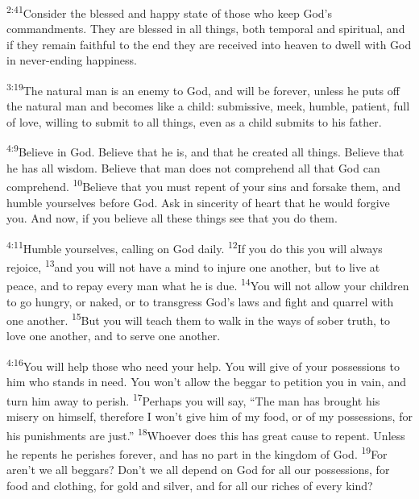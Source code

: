 \documentclass[openany,12pt,english]{book}
\newenvironment{para}{\par\pretolerance=100\tolerance=200\setlength{\emergencystretch}{0.6em}\relax}{\par}
\begin{document}
\begin{para}
    \textsuperscript{2:41}\thinspace{}Con\-sid\-er the bless\-ed and hap\-py state of those who keep God's commandments. They are bless\-ed in all things, both tem\-po\-ral and spir\-it\-u\-al, and if they re\-main faith\-ful to the end they are re\-ceived in\-to heav\-en to dwell with God in never-ending hap\-pi\-ness.
\end{para}

\begin{para}
    \textsuperscript{3:19}\thinspace{}The nat\-u\-ral man is an en\-e\-my to God, and will be for\-ev\-er, un\-less he puts off the nat\-u\-ral man and becomes like a child: sub\-mis\-sive, meek, hum\-ble, pa\-tient, full of love, will\-ing to sub\-mit to all things, e\-ven as a child submits to his fa\-ther.
\end{para}

\begin{para}
    \textsuperscript{4:9}\thinspace{}Be\-lieve in God. Be\-lieve that he is, and that he cre\-at\-ed all things. Be\-lieve that he has all wis\-dom. Be\-lieve that man does not com\-pre\-hend all that God can com\-pre\-hend.
    \textsuperscript{10}\thinspace{}Be\-lieve that you must re\-pent of your sins and for\-sake them, and hum\-ble your\-selves be\-fore God. Ask in sin\-cer\-i\-ty of heart that he would for\-give you. And now, if you be\-lieve all these things see that you do them.
\end{para}

\begin{para}
    \textsuperscript{4:11}\thinspace{}Hum\-ble your\-selves, call\-ing on God dai\-ly.
    \textsuperscript{12}\thinspace{}If you do this you will al\-ways re\-joice,
    \textsuperscript{13}\thinspace{}and you will not have a mind to in\-jure one an\-oth\-er, but to live at peace, and to re\-pay eve\-ry man what he is due.
    \textsuperscript{14}\thinspace{}You will not al\-low your chil\-dren to go hun\-gry, or na\-ked, or to trans\-gress God's laws and fight and quar\-rel with one an\-oth\-er.
    \textsuperscript{15}\thinspace{}But you will teach them to walk in the ways of so\-ber truth, to love one an\-oth\-er, and to serve one an\-oth\-er.
\end{para}

\begin{para}
    \textsuperscript{4:16}\thinspace{}You will help those who need your help. You will give of your possessions to him who stands in need. You won't al\-low the beg\-gar to pe\-ti\-tion you in vain, and turn him a\-way to per\-ish.
    \textsuperscript{17}\thinspace{}Per\-haps you will say, “The man has brought his mis\-er\-y on him\-self, there\-fore I won't give him of my food, or of my possessions, for his punishments are just.”
    \textsuperscript{18}\thinspace{}Who\-ev\-er does this has great cause to re\-pent. Un\-less he repents he perishes for\-ev\-er, and has no part in the king\-dom of God.
    \textsuperscript{19}\thinspace{}For aren't we all beggars? Don't we all de\-pend on God for all our possessions, for food and cloth\-ing, for gold and sil\-ver, and for all our rich\-es of eve\-ry kind?
\end{para}
\end{document}
